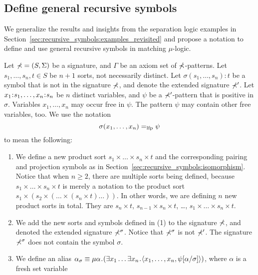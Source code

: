 \documentclass{amsart}
\begin{document}
\subsection{Define general recursive symbols}

We generalize the results and insights
from the separation logic examples in 
Section~\ref{sec:recursive_symbols:examples_revisited}
and propose a notation to define and use general recursive symbols
in matching $\mu$-logic.

\begin{definition}
\label{def:recursive_symbols}
Let $\mathbb{\Sigma} = (S, \Sigma)$ be a signature,
and $\Gamma$ be an axiom set of $\mathbb{\Sigma}$-patterns.
Let $s_1,\dots,s_n,t \in S$ be $n+1$ sorts, not necessarily distinct.
Let $\sigma (s_1,\dots,s_n) {:} t$ be a symbol 
that is not in the signature $\mathbb{\Sigma}$,
and denote the extended signature $\mathbb{\Sigma}'$.
Let $x_1 \mathbin{\!:\!} s_1,\dots,x_n \mathbin{\!:\!} s_n$ be $n$ distinct variables,
and $\psi$ be a $\mathbb{\Sigma}'$-pattern that is positive in $\sigma$.
Variables $x_1,\dots,x_n$
may occur free in $\psi$.
The pattern $\psi$ may contain other free variables, too.
We use the notation
\begin{equation}
\sigma(x_1,\dots,x_n) =_{\mathrm{lfp}} \psi
\end{equation}
to mean the following:
\begin{enumerate}
\item We define a new product sort $s_1 \times \dots \times s_n \times t$
      and the corresponding pairing and projection symbols as in 
      Section~\ref{sec:recursive_symbols:isomorphism}.
      Notice that when $n \ge 2$, there are multiple sorts being defined,
      because $s_1 \times \dots \times s_n \times t$
      is merely a notation to the product sort
      $s_1 \times (s_2 \times ( \dots \times (s_n \times t) \dots ))$.
      In other words, we are defining $n$ new product sorts in total.
      They are $s_n \times t$, $s_{n-1} \times s_n \times t$,
      \dots, $s_1 \times \dots \times s_n \times t$.
\item We add the new sorts and symbols defined in (1) to the signature
      $\mathbb{\Sigma}$, and denoted the extended signature $\mathbb{\Sigma}^\sigma$.
      Notice that $\mathbb{\Sigma}^\sigma$ is not $\mathbb{\Sigma}'$.
      The signature $\mathbb{\Sigma}^\sigma$ does not contain the symbol $\sigma$.
\item We define an alias
      $\alpha_\sigma \equiv \mu \alpha \mathbin{\!.\!}
      (\exists x_1 \dots \exists x_n \mathbin{\!.\!}
      \langle x_1 , \dots , x_n ,
      \psi[\alpha / \sigma]
      \rangle)$,
      where $\alpha$ is a fresh set variable 

\end{enumerate}
\end{definition}
\end{document}
